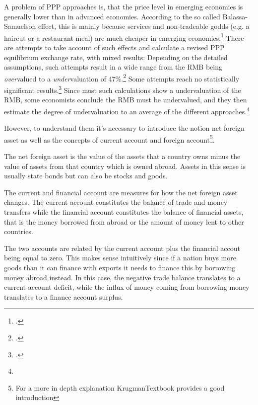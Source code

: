 A problem of PPP approaches is, that the price level in emerging economies is generally lower than in advanced economies. According to the so called Balassa-Samuelson effect, this is mainly because services and non-tradeable godds (e.g. a haircut or a restaurant meal) are much cheaper in emerging economics.\footnote{\cite[pp. 82]{CheungChinn2010}.} There are attempts to take account of such effects and calculate a revised PPP equilibrium exchange rate, with mixed results: Depending on the detailed assumptions, such attempts result in a wide range from the RMB being \emph{over}valued to a \emph{under}valuation of 47\%.\footnote{\cite[pp. 72]{Subramanian}.} Some attempts reach no statistically significant results.\footnote{\cite[p. 83]{CheungChinn2010}.} Since most such calculations show a undervaluation of the RMB, some economists conclude the RMB must be undervalued, and they then estimate the degree of undervaluation to an average of the different approaches.\footnote{}%


However, to understand them it's necessary to introduce the notion net 
foreign asset as well as the concepts of current account and foreign 
account\footnote{For a more in depth explanation \cite{ch.  
18}{KrugmanTextbook} provides a good introduction}.

The net foreign asset is the value of the assets that a country owns 
minus the value of assets from that country which is owned abroad.  
Assets in this sense is usually state bonds but can also be stocks and 
goods.  

The current and financial account are measures for how the net foreign asset changes.  
The current account constitutes the balance of trade and money transfers 
while the financial account constitutes the balance of financial assets, 
that is the money borrowed from abroad or the amount of money lent to 
other countries. 

The two accounts are related by the current account plus the financial 
accout being equal to zero. This makes sense intuitively since if a 
nation buys more goods than it can finance with exports it needs to 
finance this by borrowing money abroad instead. In this case, the 
negative trade balance translates to a current account deficit, while 
the influx of money coming from borrowing money translates to a finance 
account surplus.

